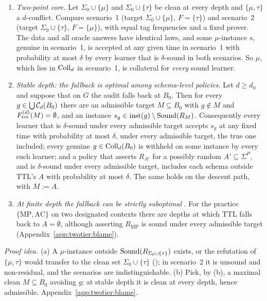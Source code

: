 \begin{theorem}\label{thm:twotier:blame}
\leavevmode
\begin{enumerate}[label=(\alph*),leftmargin=*]
\item \emph{Two-point core.} Let $\Sigma_0\cup\{\mu\}$ and $\Sigma_0\cup\{\tau\}$ be clean at every depth and $\{\mu,\tau\}$ a $d$-conflict. Compare scenario~1 (target $\Sigma_0\cup\{\mu\}$, $F=\{\tau\}$) and scenario~2 (target $\Sigma_0\cup\{\tau\}$, $F=\{\mu\}$), with equal tag frequencies and a fixed prover. The data and all oracle answers have identical laws, and some $\mu$-instance $s$, genuine in scenario~1, is accepted at any given time in scenario~1 with probability at most $\delta$ by every learner that is $\delta$-sound in both scenarios. So $\mu$, which lies in $\mathrm{Coll}_d$ in scenario~1, is collateral for \emph{every} sound learner.
\item \emph{Stable depth: the fallback is optimal among schema-level policies.} Let $d\ge d_0$ and suppose that on $G$ the audit falls back at $B_0$. Then for every $g\in\bigcup\mathcal{C}_d(B_0)$ there are an admissible target $M\subseteq B_0$ with $g\notin M$ and $F^{(d)}_{\mathrm{res}}(M)=\emptyset$, and an instance $s_g\in\mathrm{inst}(g)\setminus\mathrm{Sound}(R_M)$. Consequently every learner that is $\delta$-sound under every admissible target accepts $s_g$ at any fixed time with probability at most $\delta$, under every admissible target, the true one included; every genuine $g\in\mathrm{Coll}_d(B_0)$ is withheld on some instance by every such learner; and a policy that asserts $R_{A'}$ for a possibly random $A'\subseteq\Sigma^P$, and is $\delta$-sound under every admissible target, includes each schema outside TTL's $A$ with probability at most $\delta$. The same holds on the descent path, with $M:=A$.
\item \emph{At finite depth the fallback can be strictly suboptimal} . For the practice $\{\mathrm{MP},\mathrm{AC}\}$ on two designated contexts there are depths at which TTL falls back to $A=\emptyset$, although asserting $R_{\mathrm{MP}}$ is sound under every admissible target (Appendix~\ref{app:twotier:blame}).
\end{enumerate}
\end{theorem}

\noindent\emph{Proof idea.} (a) A $\mu$-instance outside $\mathrm{Sound}(R_{\Sigma_0\cup\{\tau\}})$ exists, or the refutation of $\{\mu,\tau\}$ would transfer to the clean set $\Sigma_0\cup\{\tau\}$ (); in scenario~2 it is unsound and non-residual, and the scenarios are indistinguishable. (b) Pick, by (b), a maximal clean $M\subseteq B_0$ avoiding $g$; at stable depth it is clean at every depth, hence admissible. Appendix~\ref{app:twotier:blame}.

